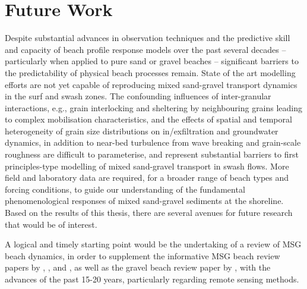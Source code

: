 

\section{Future Work}\label{section:FutureWork}

Despite substantial advances in observation techniques and the predictive skill and capacity of beach profile response models over the past several decades -- particularly when applied to pure sand or gravel beaches -- significant barriers to the predictability of physical beach processes remain. State of the art modelling efforts are not yet capable of reproducing mixed sand-gravel transport dynamics in the surf and swash zones. The confounding influences of inter-granular interactions, e.g., grain interlocking and sheltering by neighbouring grains leading to complex mobilisation characteristics, and the effects of spatial and temporal heterogeneity of grain size distributions on in/exfiltration and groundwater dynamics, in addition to near-bed turbulence from wave breaking and grain-scale roughness are difficult to parameterise, and represent substantial barriers to first principles-type modelling of mixed sand-gravel transport in swash flows. More field and laboratory data are required, for a broader range of beach types and forcing conditions, to guide our understanding of the fundamental phenomenological responses of mixed sand-gravel sediments at the shoreline. Based on the results of this thesis, there are several avenues for future research that would be of interest.

A logical and timely starting point would be the undertaking of a review of MSG beach dynamics, in order to supplement the informative MSG beach review papers by \citet{Kirk1980}, \citet{Mason_Coates2001}, and \citet{Pontee_etal2004}, as well as the gravel beach review paper by \citet{Buscombe_Masselink2006}, with the advances of the past 15-20 years, particularly regarding remote sensing methods.

